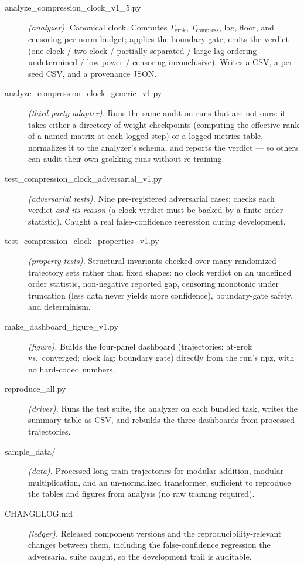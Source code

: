 \documentclass[11pt]{article}
\begin{document}
\begin{description}
\item[\ttfamily analyze\_compression\_clock\_v1\_5.py] \emph{(analyzer).} Canonical clock. Computes
$T_{\mathrm{grok}}$, $T_{\mathrm{compress}}$, lag, floor, and censoring per norm budget; applies the
boundary gate; emits the verdict (one-clock / two-clock / partially-separated /
large-lag-ordering-undetermined / low-power / censoring-inconclusive). Writes a CSV, a per-seed CSV, and
a provenance JSON.
\item[\ttfamily analyze\_compression\_clock\_generic\_v1.py] \emph{(third-party adapter).} Runs the same
audit on runs that are not ours: it takes either a directory of weight checkpoints (computing the
effective rank of a named matrix at each logged step) or a logged metrics table, normalizes it to the
analyzer's schema, and reports the verdict --- so others can audit their own grokking runs without
re-training.
\item[\ttfamily test\_compression\_clock\_adversarial\_v1.py] \emph{(adversarial tests).} Nine
pre-registered adversarial cases; checks each verdict \emph{and its reason} (a clock verdict must be
backed by a finite order statistic). Caught a real false-confidence regression during development.
\item[\ttfamily test\_compression\_clock\_properties\_v1.py] \emph{(property tests).} Structural
invariants checked over many randomized trajectory sets rather than fixed shapes: no clock verdict on an
undefined order statistic, non-negative reported gap, censoring monotonic under truncation (less data
never yields more confidence), boundary-gate safety, and determinism.
\item[\ttfamily make\_dashboard\_figure\_v1.py] \emph{(figure).} Builds the four-panel dashboard
(trajectories; at-grok vs.\ converged; clock lag; boundary gate) directly from the run's npz, with no
hard-coded numbers.
\item[\ttfamily reproduce\_all.py] \emph{(driver).} Runs the test suite, the analyzer on each bundled
task, writes the summary table as CSV, and rebuilds the three dashboards from processed trajectories.
\item[\ttfamily sample\_data/] \emph{(data).} Processed long-train trajectories for modular addition,
modular multiplication, and an un-normalized transformer, sufficient to reproduce the tables and figures
from analysis (no raw training required).
\item[\ttfamily CHANGELOG.md] \emph{(ledger).} Released component versions and the
reproducibility-relevant changes between them, including the false-confidence regression the
adversarial suite caught, so the development trail is auditable.
\end{description}
\end{document}
